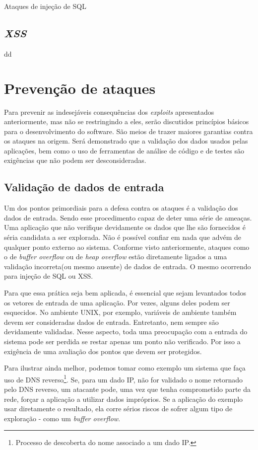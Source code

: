 			Ataques de injeção de SQL 

		\subsection{\textsl{XSS}}
			dd

	\section{Prevenção de ataques}
		Para prevenir as indesejáveis consequências dos \textsl{exploits} apresentados
		anteriormente, mas não se restringindo a eles, serão discutidos princípios básicos
		para o desenvolvimento do software. São meios de trazer maiores garantias contra os ataques
		na origem. Será demonstrado que a validação dos dados usados pelas aplicações, bem como
		o uso de ferramentas de análise de código e de testes são exigências que não podem
		ser desconsideradas. 

		
		\subsection{Validação de dados de entrada}
			Um dos pontos primordiais para a defesa contra os ataques é a validação dos dados de entrada.
			Sendo esse procedimento capaz de deter uma série de ameaças. Uma aplicação que não verifique
			devidamente os dados que lhe são fornecidos é séria candidata a ser explorada. Não é possível
			confiar em nada que advém de qualquer ponto externo ao sistema. Conforme visto anteriormente,
			ataques como o de \textsl{buffer overflow} ou de \textsl{heap overflow} estão diretamente
			ligados a uma validação incorreta(ou mesmo ausente) de dados de entrada. O mesmo ocorrendo
			para injeção de SQL ou XSS.


			Para que essa prática seja bem aplicada, é essencial que sejam levantados todos os vetores
			de entrada de uma aplicação. Por vezes, alguns deles podem ser esquecidos. No ambiente UNIX,
			por exemplo, variáveis de ambiente também devem ser consideradas dados de entrada. Entretanto,
			nem sempre são devidamente validadas. Nesse aspecto, toda uma preocupação com a entrada
			do sistema pode ser perdida se restar apenas um ponto não verificado. Por isso a exigência
			de uma avaliação dos pontos que devem ser protegidos.


			Para ilustrar ainda melhor, podemos tomar como exemplo um sistema que faça uso de 
			DNS reverso\footnote{Processo de descoberta do nome associado a um dado IP.}. Se, para um
			dado IP, não for validado o nome retornado pelo DNS reverso, um atacante pode, uma vez que
			tenha comprometido parte da rede, forçar a aplicação a utilizar dados impróprios.
			Se a aplicação do exemplo usar diretamente o resultado, ela corre sérios riscos de sofrer
			algum tipo de exploração - como um \textsl{buffer overflow}.


